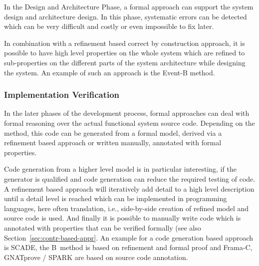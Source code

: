 In the Design and Architecture Phase, a formal approach can support the
system design and architecture design. In this phase, systematic errors
can be detected which can be very difficult and costly or even impossible
to fix later.

In combination with a refinement based correct by construction approach,
it is possible to have high level properties on the whole system which
are refined to sub-properties on the different parts of the system
architecture while designing the system. An example of such an approach
is the Event-B method.

\subsubsection{Implementation Verification}
\label{sec:impl-verif}

In the later phases of the development process, formal approaches can
deal with formal reasoning over the actual functional system source
code. Depending on the method, this code can be generated from a formal
model, derived via a refinement based approach or written manually,
annotated with formal properties.

Code generation from a higher level model is in particular interesting,
if the generator is qualified and code generation can reduce the required
testing of code. A refinement based approach will iteratively add detail
to a high level description until a detail level is reached which can be
implemented in programming languages, here often translation, i.e.,
side-by-side creation of refined model and source code is used. And
finally it is possible to manually write code which is annotated with
properties that can be verified formally (see also
Section~\ref{sec:contr-based-appr}. An example for a code generation
based approach is SCADE, the B~method is based on refinement and formal
proof and Frama-C, GNATprove / SPARK are based on source code annotation.

